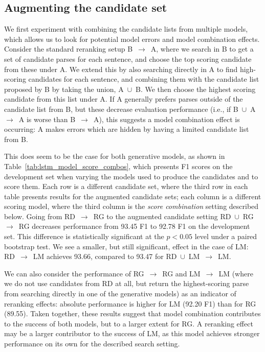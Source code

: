 \documentclass[11pt,a4paper]{article}
\newcommand{\p}{\ensuremath{\rightarrow}\xspace}
\newcommand{\un}{\ensuremath{\cup}\xspace}
\begin{document}
\subsection{Augmenting the candidate set}
\label{sec:augmenting}
We first experiment with combining the candidate lists from multiple models,  which allows us to look for potential model errors and model combination effects. Consider the standard reranking setup \mbox{B \p A}, where we search in B to get a set of candidate parses for each sentence, and choose the top scoring candidate from these under A. We extend this by also searching directly in A to find high-scoring candidates for each sentence, and combining them with the candidate list proposed by B by taking the union, \mbox{A \un B}. We then choose the highest scoring candidate from this list under A.
If A generally prefers parses outside of the candidate list from B, but these decrease evaluation performance (i.e., if \mbox{B \un A \p A} is worse than \mbox{B \p A}), this suggests a model combination effect is occurring: A makes errors which are hidden by having a limited candidate list from B.

This does seem to be the case for both generative models, as shown in Table~\ref{tab:lstm_model_score_combos}, which presents F1 scores on the development set when varying the models used to produce the candidates and to score them. Each row is a different candidate set, where the third row in each table presents results for the augmented candidate sets; each column is a different scoring model,  where the third column is the \emph{score combination} setting described below. Going from \mbox{RD \p RG} to the augmented candidate setting \mbox{RD \un RG \p RG} decreases performance from 93.45 F1 to 92.78 F1 on the development set. This difference is statistically significant at the $p < 0.05$ level under a paired bootstrap test. We see a smaller, but still significant, effect in the case of LM: \mbox{RD \p LM} achieves 93.66, compared to 93.47 for \mbox{RD \un LM \p LM}.

We can also consider the performance of \mbox{RG \p RG}  and \mbox{LM \p LM} (where we do not use candidates from RD at all, but return the highest-scoring parse from searching directly in one of the generative models) as an indicator of reranking effects: absolute performance is higher for LM (92.20 F1) than for RG (89.55).
Taken together, these results suggest that model combination contributes to the success of both models, but to a larger extent for RG. A reranking effect may be a larger contributor to the success of LM, as this model achieves stronger performance on its own for the described search setting.
\end{document}
